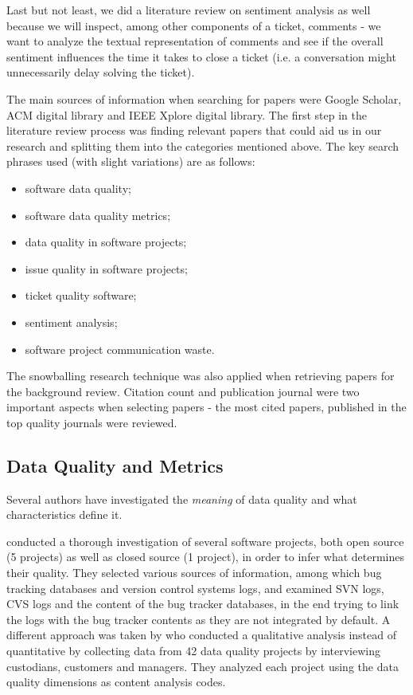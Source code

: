 \documentclass{mprop}
\begin{document}
Last but not least, we did a literature review on sentiment analysis as well 
because we will inspect, among other components of a ticket, comments - we want 
to analyze the textual representation of comments and see if the overall 
sentiment influences the time it takes to close a ticket (i.e. a conversation
might unnecessarily delay solving the ticket).

The main sources of information when searching for papers were Google Scholar, 
ACM digital library and IEEE Xplore digital library. The first step in the 
literature review process was finding relevant papers that could aid us in
our research and splitting them into the categories mentioned above. The
key search phrases used (with slight variations) are as follows:
  \begin{itemize}
    \item software data quality;
    \item software data quality metrics;
    \item data quality in software projects;
    \item issue quality in software projects;
    \item ticket quality software;
    \item sentiment analysis;
    \item software project communication waste.
  \end{itemize}

The snowballing research technique was also applied when retrieving papers for the
background review. Citation count and publication journal were two important aspects 
when selecting papers - the most cited papers, published in the top quality journals were reviewed.

\subsection{Data Quality and Metrics}\label{data_quality}

Several authors have investigated the \emph{meaning} of data quality and
what characteristics define it.

\citet{bachmann2009software} conducted a thorough investigation of several
software projects, both open source (5 projects) as well as closed source (1 
project), in order to infer what determines their quality. They selected 
various sources of information, among which bug tracking 
databases and version control systems logs, and examined SVN logs, CVS logs
and the content of the bug tracker databases, in the end trying to link 
the logs with the bug tracker contents as they are not integrated by default. 
A different approach was taken by \citet{strong1997data} who conducted a qualitative analysis
instead of quantitative by collecting data from 42 data quality projects by 
interviewing custodians, customers and managers. They analyzed each project
using the data quality dimensions as content analysis codes.
\end{document}

